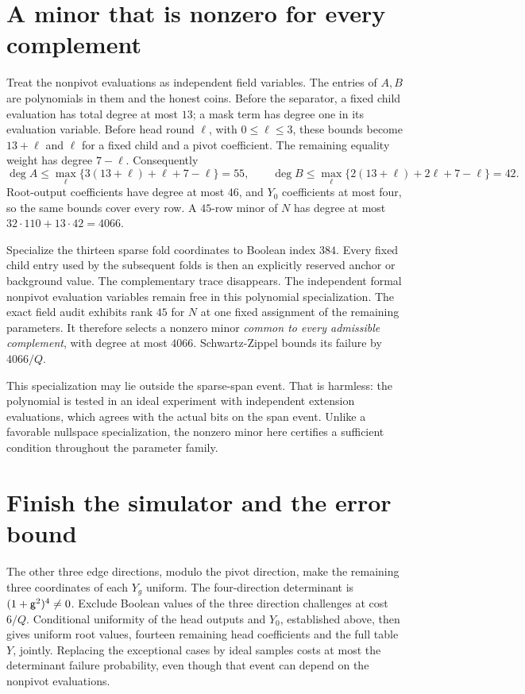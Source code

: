 \documentclass[11pt]{article}
\begin{document}
\section{A minor that is nonzero for every complement}

Treat the nonpivot evaluations as independent field variables. The entries of $A,B$ are polynomials in them and the honest coins. Before the separator, a fixed child evaluation has total degree at most $13$; a mask term has degree one in its evaluation variable. Before head round $\ell$, with $0\le\ell\le3$, these bounds become $13+\ell$ and $\ell$ for a fixed child and a pivot coefficient. The remaining equality weight has degree $7-\ell$. Consequently
\[
 \deg A\le\max_\ell\{3(13+\ell)+\ell+7-\ell\}=55,
 \qquad
 \deg B\le\max_\ell\{2(13+\ell)+2\ell+7-\ell\}=42.
\]
Root-output coefficients have degree at most $46$, and $Y_0$ coefficients at most four, so the same bounds cover every row. A $45$-row minor of $N$ has degree at most $32\cdot110+13\cdot42=4066$.

Specialize the thirteen sparse fold coordinates to Boolean index $384$. Every fixed child entry used by the subsequent folds is then an explicitly reserved anchor or background value. The complementary trace disappears. The independent formal nonpivot evaluation variables remain free in this polynomial specialization. The exact field audit exhibits rank $45$ for $N$ at one fixed assignment of the remaining parameters. It therefore selects a nonzero minor \emph{common to every admissible complement}, with degree at most $4066$. Schwartz-Zippel bounds its failure by $4066/Q$.

This specialization may lie outside the sparse-span event. That is harmless: the polynomial is tested in an ideal experiment with independent extension evaluations, which agrees with the actual bits on the span event. Unlike a favorable nullspace specialization, the nonzero minor here certifies a sufficient condition throughout the parameter family.

\section{Finish the simulator and the error bound}

The other three edge directions, modulo the pivot direction, make the remaining three coordinates of each $Y_g$ uniform. The four-direction determinant is $(1+\mathsf{g}^2)^4\ne0$. Exclude Boolean values of the three direction challenges at cost $6/Q$. Conditional uniformity of the head outputs and $Y_0$, established above, then gives uniform root values, fourteen remaining head coefficients and the full table $Y$, jointly. Replacing the exceptional cases by ideal samples costs at most the determinant failure probability, even though that event can depend on the nonpivot evaluations.
\end{document}
